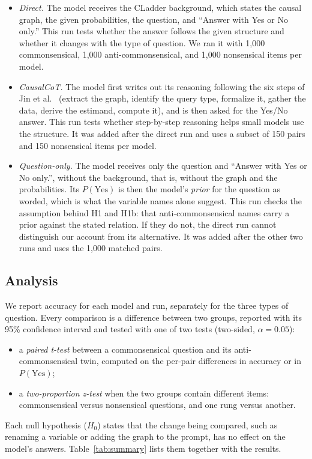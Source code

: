 \documentclass{llncs}
\begin{document}
\begin{itemize}
  \item \emph{Direct.} The model receives the CLadder background, which states the causal graph, the given probabilities, the question, and ``Answer with Yes or No only.'' This run tests whether the answer follows the given structure and whether it changes with the type of question. We ran it with 1,000 commonsensical, 1,000 anti-commonsensical, and 1,000 nonsensical items per model.
  \item \emph{CausalCoT.} The model first writes out its reasoning following the six steps of Jin et al.\ \cite{jin2023cladder} (extract the graph, identify the query type, formalize it, gather the data, derive the estimand, compute it), and is then asked for the Yes/No answer. This run tests whether step-by-step reasoning helps small models use the structure. It was added after the direct run and uses a subset of 150 pairs and 150 nonsensical items per model.
  \item \emph{Question-only.} The model receives only the question and ``Answer with Yes or No only.'', without the background, that is, without the graph and the probabilities. Its $P(\text{Yes})$ is then the model's \emph{prior} for the question as worded, which is what the variable names alone suggest. This run checks the assumption behind H1 and H1b: that anti-commonsensical names carry a prior against the stated relation. If they do not, the direct run cannot distinguish our account from its alternative. It was added after the other two runs and uses the 1,000 matched pairs.
\end{itemize}

\subsection{Analysis}
\label{sec:analysis}

We report accuracy for each model and run, separately for the three types of question. Every comparison is a difference between two groups, reported with its 95\% confidence interval and tested with one of two tests (two-sided, $\alpha = 0.05$):
\begin{itemize}
\item a \emph{paired t-test} between a commonsensical question and its anti-commonsensical twin, computed on the per-pair differences in accuracy or in $P(\text{Yes})$;
\item a \emph{two-proportion z-test} when the two groups contain different items: commonsensical versus nonsensical questions, and one rung versus another.
\end{itemize}
Each null hypothesis ($H_0$) states that the change being compared, such as renaming a variable or adding the graph to the prompt, has no effect on the model's answers. Table~\ref{tab:summary} lists them together with the results.
\end{document}
